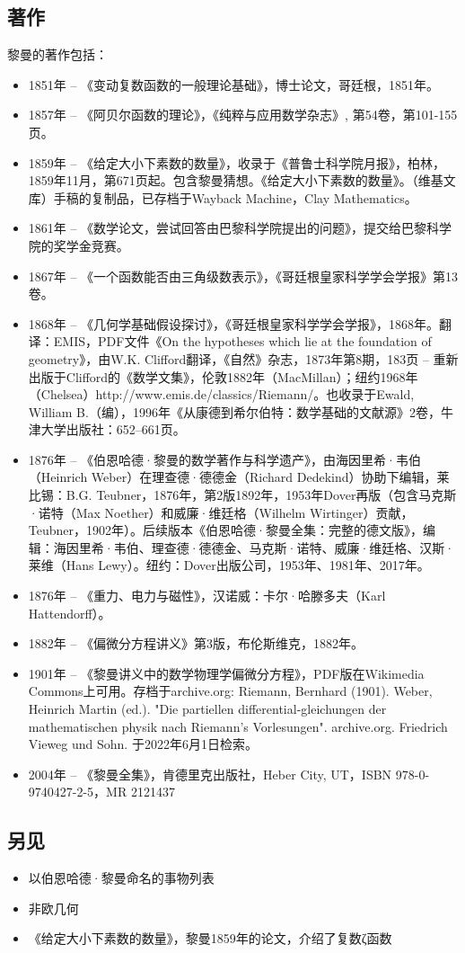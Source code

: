 \subsection{著作}
黎曼的著作包括：
\begin{itemize}
\item 1851年 – 《变动复数函数的一般理论基础》，博士论文，哥廷根，1851年。
\item 1857年 – 《阿贝尔函数的理论》，《纯粹与应用数学杂志》, 第54卷，第101-155页。
\item 1859年 – 《给定大小下素数的数量》，收录于《普鲁士科学院月报》，柏林，1859年11月，第671页起。包含黎曼猜想。《给定大小下素数的数量》。（维基文库）手稿的复制品，已存档于Wayback Machine，Clay Mathematics。
\item 1861年 – 《数学论文，尝试回答由巴黎科学院提出的问题》，提交给巴黎科学院的奖学金竞赛。
\item 1867年 – 《一个函数能否由三角级数表示》，《哥廷根皇家科学学会学报》第13卷。
\item 1868年 – 《几何学基础假设探讨》，《哥廷根皇家科学学会学报》，1868年。翻译：EMIS，PDF文件《On the hypotheses which lie at the foundation of geometry》，由W.K. Clifford翻译，《自然》杂志，1873年第8期，183页 – 重新出版于Clifford的《数学文集》，伦敦1882年（MacMillan）；纽约1968年（Chelsea）http://www.emis.de/classics/Riemann/。也收录于Ewald, William B.（编），1996年《从康德到希尔伯特：数学基础的文献源》2卷，牛津大学出版社：652–661页。
\item 1876年 – 《伯恩哈德·黎曼的数学著作与科学遗产》，由海因里希·韦伯（Heinrich Weber）在理查德·德德金（Richard Dedekind）协助下编辑，莱比锡：B.G. Teubner，1876年，第2版1892年，1953年Dover再版（包含马克斯·诺特（Max Noether）和威廉·维廷格（Wilhelm Wirtinger）贡献，Teubner，1902年）。后续版本《伯恩哈德·黎曼全集：完整的德文版》，编辑：海因里希·韦伯、理查德·德德金、马克斯·诺特、威廉·维廷格、汉斯·莱维（Hans Lewy）。纽约：Dover出版公司，1953年、1981年、2017年。
\item 1876年 – 《重力、电力与磁性》，汉诺威：卡尔·哈滕多夫（Karl Hattendorff）。
\item 1882年 – 《偏微分方程讲义》第3版，布伦斯维克，1882年。
\item 1901年 – 《黎曼讲义中的数学物理学偏微分方程》，PDF版在Wikimedia Commons上可用。存档于archive.org: Riemann, Bernhard (1901). Weber, Heinrich Martin (ed.). "Die partiellen differential-gleichungen der mathematischen physik nach Riemann's Vorlesungen". archive.org. Friedrich Vieweg und Sohn. 于2022年6月1日检索。
\item 2004年 – 《黎曼全集》，肯德里克出版社，Heber City, UT，ISBN 978-0-9740427-2-5，MR 2121437
\end{itemize}
\subsection{另见}
\begin{itemize}
\item 以伯恩哈德·黎曼命名的事物列表
\item 非欧几何
\item 《给定大小下素数的数量》，黎曼1859年的论文，介绍了复数ζ函数
\end{itemize}